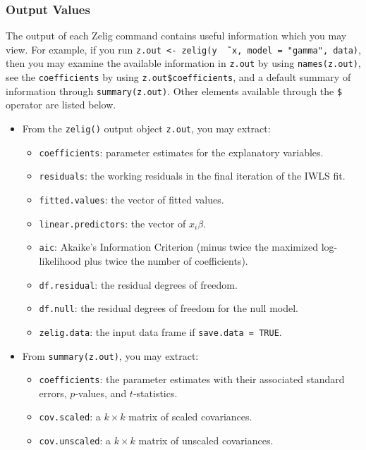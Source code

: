\documentclass{article}
\begin{document}
\subsubsection{Output Values}

The output of each Zelig command contains useful information which you
may view.  For example, if you run \texttt{z.out <- zelig(y \~\,
  x, model = "gamma", data)}, then you may examine the available
information in \texttt{z.out} by using \texttt{names(z.out)},
see the {\tt coefficients} by using {\tt z.out\$coefficients}, and
a default summary of information through \texttt{summary(z.out)}.
Other elements available through the {\tt \$} operator are listed
below.

\begin{itemize}
\item From the {\tt zelig()} output object {\tt z.out}, you may
  extract:
   \begin{itemize}
   \item {\tt coefficients}: parameter estimates for the explanatory
     variables.
   \item {\tt residuals}: the working residuals in the final iteration
     of the IWLS fit.
   \item {\tt fitted.values}: the vector of fitted values.
   \item {\tt linear.predictors}: the vector of $x_{i}\beta$.
   \item {\tt aic}: Akaike's Information Criterion (minus twice the
     maximized log-likelihood plus twice the number of coefficients).
   \item {\tt df.residual}: the residual degrees of freedom.
   \item {\tt df.null}: the residual degrees of freedom for the null
     model.
   \item {\tt zelig.data}: the input data frame if {\tt save.data = TRUE}.  
   \end{itemize}

\item From {\tt summary(z.out)}, you may extract: 
   \begin{itemize}
   \item {\tt coefficients}: the parameter estimates with their
     associated standard errors, $p$-values, and $t$-statistics.
   \item{\tt cov.scaled}: a $k \times k$ matrix of scaled covariances.
   \item{\tt cov.unscaled}: a $k \times k$ matrix of unscaled
     covariances.  
   \end{itemize}


\end{itemize}
\end{document}
